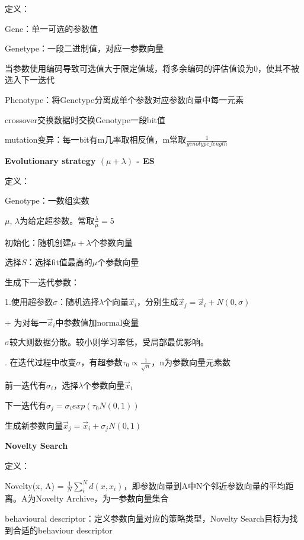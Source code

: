 \documentclass[UTF8]{ctexart}
\begin{document}
  \quad 定义：

  \quad \quad Gene：单一可选的参数值
  
  \quad \quad Genetype：一段二进制值，对应一参数向量
  
  \quad \quad \quad 当参数使用编码导致可选值大于限定值域，将多余编码的评估值设为0，使其不被选入下一迭代

  \quad \quad Phenotype：将Genetype分离成单个参数对应参数向量中每一元素

  \quad crossover交换数据时交换Genotype一段bit值

  \quad mutation变异：每一bit有m几率取相反值，m常取$\frac{1}{genotype\_length}$

  \textbf{Evolutionary strategy $(\mu + \lambda)$ - ES}

  \quad 定义： 

  \quad \quad Genotype：一数组实数

  \quad \quad $\mu$, $\lambda$为给定超参数。常取$\frac{\lambda}{\mu} = 5$

  \quad 初始化：随机创建$\mu + \lambda$个参数向量

  \quad 选择$S$：选择fit值最高的$\mu$个参数向量

  \quad 生成下一迭代参数：
  
  \quad \quad 1.使用超参数$\sigma$：随机选择$\lambda$个向量$\vec{x}_i$，分别生成$\vec{x}_j = \vec{x}_i + N(0, \sigma)$

  \quad \quad \quad + 为对每一$\vec{x}_i$中参数值加normal变量

  \quad \quad \quad $\sigma$较大则数据分散。较小则学习率低，受局部最优影响。

  \quad {}. 在迭代过程中改变$\sigma$，有超参数$\tau_0 \propto \frac{1}{\sqrt{n}}$，n为参数向量元素数

  \quad \quad \quad 前一迭代有$\sigma_i$，选择$\lambda$个参数向量$\vec{x}_i$

  \quad \quad \quad 下一迭代有$\sigma_j = \sigma_i exp(\tau_0N(0, 1))$

  \quad \quad \quad 生成新参数向量$\vec{x}_j = \vec{x}_i + \sigma_jN(0, 1)$

  \textbf{Novelty Search}

  \quad 定义：
  
  \quad \quad Novelty(x, A) = $\frac{1}{N}\sum_i^{N}d(x, x_i)$，即参数向量到A中N个邻近参数向量的平均距离。A为Novelty Archive，为一参数向量集合

  \quad \quad behavioural descriptor：定义参数向量对应的策略类型，Novelty Search目标为找到合适的behaviour descriptor
\end{document}
